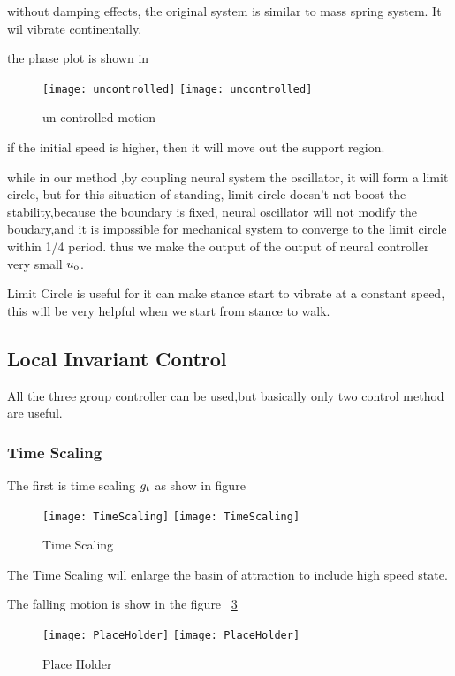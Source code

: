 without damping effects, the original system is similar to mass spring system.
It wil vibrate continentally.

the phase plot is shown in
\begin{figure}[!htbp]
  \begin{center}
    \leavevmode
    \ifpdf
      \texttt{[image: uncontrolled]}
    \else
      \texttt{[image: uncontrolled]}
    \fi
    \caption{un controlled motion}
    \label{fig:stancepostures}
\end{center}
\end{figure}

if the initial speed is higher, then it will move out the support region.



while in our method ,by coupling neural system the oscillator, it will form a limit circle,
but for this situation of standing, limit circle doesn't not boost the stability,because the boundary is fixed,
neural oscillator will not modify the boudary,and it is impossible for mechanical system to converge to the limit circle within 1/4 period.
thus we make the output of the output of neural controller very small $u_{\mathrm{o}}$.

Limit Circle is useful for it can make stance start to vibrate at a constant speed, this will be very helpful when we start from stance to walk.

\subsection{Local Invariant Control}
All the three group controller can be used,but basically only two control method are useful.
\subsubsection*{Time Scaling}
The first is time scaling $g_{\mathrm{t}}$
as show in figure
\begin{figure}[!htbp]
  \begin{center}
    \leavevmode
    \ifpdf
      \texttt{[image: TimeScaling]}
    \else
      \texttt{[image: TimeScaling]}
    \fi
    \caption{Time Scaling}
    \label{fig:stanceTimeScaling}
\end{center}
\end{figure}
The Time Scaling will enlarge the basin of attraction to include high speed state.

The falling motion is show in the figure ~\ref{fig:stancefall}
\begin{figure}[!htbp]
  \begin{center}
    \leavevmode
    \ifpdf
      \texttt{[image: PlaceHolder]}
    \else
      \texttt{[image: PlaceHolder]}
    \fi
    \caption{Place Holder}
    \label{fig:stancefall}
\end{center}
\end{figure}

